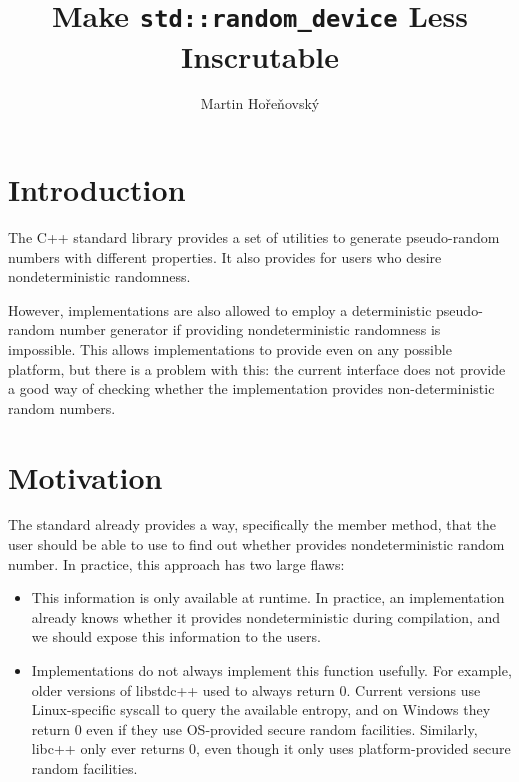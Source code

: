 \documentclass{wg21}
\title{Make \texttt{std::random\_device} Less Inscrutable}
\author{Martin Hořeňovský}{martin.horenovsky@gmail.com}
\begin{document}
\maketitle



\hypertarget{introduction}{%
    \section{Introduction}\label{introduction}}

The C++ standard library provides a set of utilities to generate
pseudo-random numbers with different properties. It also provides
 for users who desire nondeterministic
randomness.

However, implementations are also allowed to employ a deterministic
pseudo-random number generator if providing nondeterministic randomness
is impossible. This allows implementations to provide
 even on any possible platform, but there
is a problem with this: the current interface does not provide a good
way of checking whether the implementation provides non-deterministic
random numbers.


\hypertarget{motivation}{%
    \section{Motivation}\label{motivation}}

The standard already provides a way, specifically the
 member method, that the user should
be able to use to find out whether  provides
nondeterministic random number. In practice, this approach has two large
flaws:

\begin{itemize}
    \item This information is only available at runtime. In practice,
          an implementation already knows whether it provides
          nondeterministic  during compilation,
          and we should expose this information to the users.
    \item Implementations do not always implement this function usefully.
          For example, older versions of libstdc++ used to always return 0.
          Current versions use Linux-specific syscall to query the
          available entropy, and on Windows they return 0 even if they use
          OS-provided secure random facilities. Similarly, libc++ only ever
          returns 0, even though it only uses platform-provided secure
          random facilities.
\end{itemize}
\end{document}
